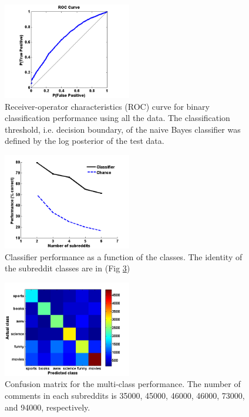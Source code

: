 \documentclass[10pt,twocolumn]{article}
\begin{document}
\begin{figure}
    \centering
  	\includegraphics[width=0.5\textwidth]{./roc.png}
  	\caption{Receiver-operator characteristics (ROC) curve for binary classification performance using all the data. The classification threshold, i.e. decision boundary, of the naive Bayes classifier was defined by the log posterior of the test data.}
  	\label{roc}
\end{figure}		

\begin{figure}
    \centering
  	\includegraphics[width=0.5\textwidth]{./varyWBaseline.png}
  	\caption{Classifier performance as a function of the classes. The identity of the subreddit classes are in (Fig \ref{confusion})}
  	\label{classes}
\end{figure}	

\begin{figure}
    \centering
  	\includegraphics[width=0.5\textwidth]{./confusion_mat.png}
  	\caption{Confusion matrix for the multi-class performance. The number of comments in each subreddits is 35000, 45000, 46000, 46000, 73000, and 94000, respectively.}
  	\label{confusion}
\end{figure}	
\end{document}
